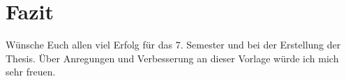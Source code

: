 \section{Fazit}
Wünsche Euch allen viel Erfolg für das 7. Semester und bei der Erstellung der Thesis. Über Anregungen und Verbesserung an dieser Vorlage würde ich mich sehr freuen. 